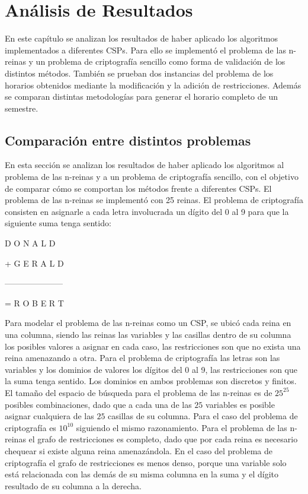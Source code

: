 \chapter{An\'alisis de Resultados}

En este cap\'itulo se analizan los resultados de haber aplicado los algoritmos implementados a diferentes CSPs. Para ello se implement\'o el problema de las n-reinas y un problema de criptograf\'ia sencillo como forma de validaci\'on de los distintos m\'etodos. Tambi\'en se prueban dos instancias del problema de los horarios obtenidos mediante la modificaci\'on y la adici\'on de restricciones. Adem\'as se comparan distintas metodolog\'ias para generar el horario completo de un semestre.

\section{Comparaci\'on entre distintos problemas}

En esta secci\'on se analizan los resultados de haber aplicado los algoritmos al problema de las n-reinas y a un problema de criptograf\'ia sencillo, con el objetivo de comparar c\'omo se comportan los m\'etodos frente a diferentes CSPs. El problema de las n-reinas se implement\'o con 25 reinas. El problema de criptograf\'ia consisten en asignarle a cada letra involucrada un d\'igito del 0 al 9 para que la siguiente suma tenga sentido:

\begin{center}
\quad D O N A L D
	
+ G E R A L D

---------------------

= R O B E R T
\end{center}

Para modelar el problema de las n-reinas como un CSP, se ubic\'o cada reina en una columna, siendo las reinas las variables y las casillas dentro de su columna los posibles valores a asignar en cada caso, las restricciones son que no exista una reina amenazando a otra. Para el problema de criptograf\'ia las letras son las variables y los dominios de valores los d\'igitos del 0 al 9, las restricciones son que la suma tenga sentido. Los dominios en ambos problemas son discretos y finitos. El tamaño del espacio de b\'usqueda para el problema de las n-reinas es de $25^{25}$ posibles combinaciones, dado que a cada una de las $25$ variables es posible asignar cualquiera de las $25$ casillas de su columna. Para el caso del problema de criptograf\'ia es $10^{10}$ siguiendo el mismo razonamiento. Para el problema de las n-reinas el grafo de restricciones es completo, dado que por cada reina es necesario chequear si existe alguna reina amenaz\'andola. En el caso del problema de criptograf\'ia el grafo de restricciones es menos denso, porque una variable solo est\'a relacionada con las dem\'as de su misma columna en la suma y el d\'igito resultado de su columna a la derecha.

